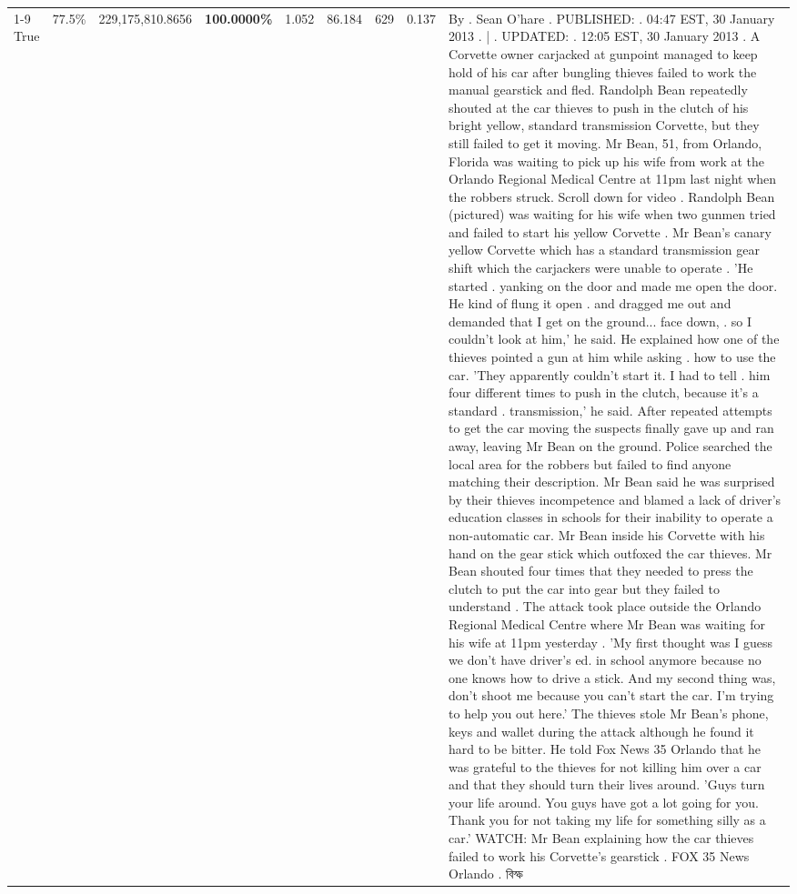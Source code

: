 \begin{table}[H]
\begin{tabular}{lllrlllll}
\cline{1-9} \cline{2-9}
True & 77.5\% & 229,175,810.8656 & \bfseries \color{red} 100.0000\% & 1.052 & 86.184 & 629 & 0.137 & By . Sean O'hare . PUBLISHED: . 04:47 EST, 30 January 2013 . | . UPDATED: . 12:05 EST, 30 January 2013 . A Corvette owner carjacked at gunpoint managed to keep hold of his car after bungling thieves failed to work the manual gearstick and fled. Randolph Bean repeatedly shouted at the car thieves to push in the clutch of his bright yellow, standard transmission Corvette, but they still failed to get it moving. Mr Bean, 51, from Orlando, Florida was waiting to pick up his wife from work at the Orlando Regional Medical Centre at 11pm last night when the robbers struck. Scroll down for video . Randolph Bean (pictured) was waiting for his wife when two gunmen tried and failed to start his yellow Corvette . Mr Bean's canary yellow Corvette which has a standard transmission gear shift which the carjackers were unable to operate . 'He started . yanking on the door and made me open the door. He kind of flung it open . and dragged me out and demanded that I get on the ground... face down, . so I couldn't look at him,' he said. He explained how one of the thieves pointed a gun at him while asking . how to use the car. 'They apparently couldn't start it. I had to tell . him four different times to push in the clutch, because it's a standard . transmission,' he said. After repeated attempts to get the car moving the suspects finally gave up and ran away, leaving Mr Bean on the ground. Police searched the local area for the robbers but failed to find anyone matching their description. Mr Bean said he was surprised by their thieves incompetence and blamed a lack of driver's education classes in schools for their inability to operate a non-automatic car. Mr Bean inside his Corvette with his hand on the gear stick which outfoxed the car thieves. Mr Bean shouted four times that they needed to press the clutch to put the car into gear but they failed to understand . The attack took place outside the Orlando Regional Medical Centre where Mr Bean was waiting for his wife at 11pm yesterday . 'My first thought was I guess we don't have driver's ed. in school anymore because no one knows how to drive a stick. And my second thing was, don't shoot me because you can't start the car. I'm trying to help you out here.' The thieves stole Mr Bean's phone, keys and wallet during the attack although he found it hard to be bitter. He told Fox News 35 Orlando that he was grateful to the thieves for not killing him over a car and that they should turn their lives around. 'Guys turn your life around. You guys have got a lot going for you. Thank you for not taking my life for something silly as a car.' WATCH: Mr Bean explaining how the car thieves failed to work his Corvette's gearstick . FOX 35 News Orlando . বিস্ফ \\

\end{tabular}
\end{table}
